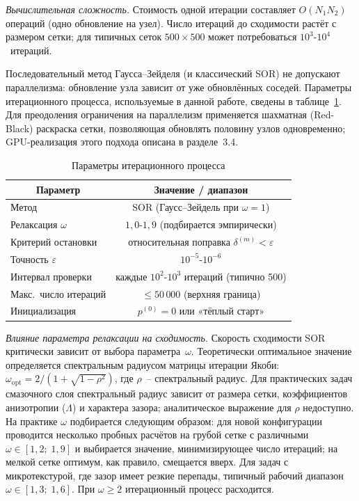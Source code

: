 \textit{Вычислительная сложность.}
Стоимость одной итерации составляет $O(N_1 N_2)$ операций (одно обновление на узел). Число итераций до сходимости растёт с размером сетки; для типичных сеток $500 \times 500$ может потребоваться $10^3$-$10^4$~итераций.

Последовательный метод Гаусса–Зейделя (и классический SOR) не допускают параллелизма: обновление узла зависит от уже обновлённых соседей. Параметры итерационного процесса, используемые в данной работе, сведены в таблице~\ref{tab:solver_params}. Для преодоления ограничения на параллелизм применяется шахматная (Red-Black) раскраска сетки, позволяющая обновлять половину узлов одновременно; GPU-реализация этого подхода описана в разделе~3.4.

\begin{table}[!ht]
\centering
\caption{Параметры итерационного процесса}
\label{tab:solver_params}
\begin{tabularx}{\textwidth}{|X|c|}
\hline
\multicolumn{1}{|c|}{\textbf{Параметр}} & \textbf{Значение / диапазон} \\
\hline
Метод               & SOR (Гаусс–Зейдель при $\omega = 1$) \\
Релаксация $\omega$ & $1{,}0$-$1{,}9$ (подбирается эмпирически) \\
Критерий остановки  & относительная поправка $\delta^{(m)} < \varepsilon$ \\
Точность $\varepsilon$ & $10^{-5}$-$10^{-6}$ \\
Интервал проверки   & каждые $10^2$-$10^3$ итераций (типично 500) \\
Макс.\ число итераций & $\leq 50\,000$ (верхняя граница) \\
Инициализация       & $p^{(0)} = 0$ или «тёплый старт» \\
\hline
\end{tabularx}
\end{table}

\FloatBarrier

\textit{Влияние параметра релаксации на сходимость.}
Скорость сходимости SOR критически зависит от выбора
параметра~$\omega$. Теоретически оптимальное значение
определяется спектральным радиусом матрицы итерации Якоби:
$\omega_{\mathrm{opt}} = 2/(1 + \sqrt{1 - \rho^2})$,
где $\rho$~-- спектральный радиус. Для практических задач
смазочного слоя спектральный радиус зависит от размера сетки,
коэффициентов анизотропии ($\Lambda$) и характера зазора;
аналитическое выражение для $\rho$ недоступно. На практике
$\omega$ подбирается следующим образом: для новой конфигурации
проводится несколько пробных расчётов на грубой сетке
с различными $\omega \in [1{,}2;\; 1{,}9]$ и выбирается
значение, минимизирующее число итераций; на мелкой сетке
оптимум, как правило, смещается вверх. Для задач
с микротекстурой, где зазор имеет резкие перепады, типичный
рабочий диапазон $\omega \in [1{,}3;\; 1{,}6]$.
При $\omega \geq 2$ итерационный процесс расходится.

